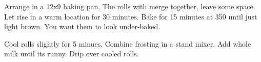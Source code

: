 \begin{recipe}
Arrange in a 12x9 baking pan. The rolls with merge together, leave some space. 
Let rise in a warm location for 30 minutes. 
Bake for 15 minutes at 350\degree{} until just light brown. 
You want them to look under-baked.


Cool rolls slightly for 5 minues. Combine frosting in a stand mixer. Add whole milk until its runny. Drip over cooled rolls. 

\end{recipe}
